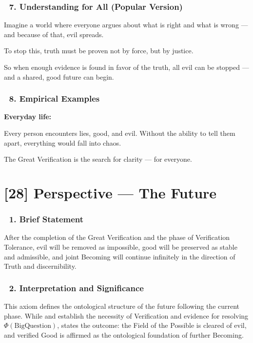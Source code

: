 \documentclass[12pt]{article}
\begin{document}
\subsubsection*{🔹 7. Understanding for All (Popular Version)}

Imagine a world where everyone argues about what is right and what is wrong — and because of that, evil spreads.

To stop this, truth must be proven not by force, but by justice.

So when enough evidence is found in favor of the truth, all evil can be stopped — and a shared, good future can begin.

\subsubsection*{🔹 8. Empirical Examples}

\textbf{Everyday life:}

Every person encounters lies, good, and evil. Without the ability to tell them apart, everything would fall into chaos.

The Great Verification is the search for clarity — for everyone.



\section*{[28] Perspective — The Future}

\subsubsection*{🔹 1. Brief Statement}

After the completion of the Great Verification and the phase of Verification Tolerance, evil will be removed as impossible, good will be preserved as stable and admissible, and joint Becoming will continue infinitely in the direction of Truth and discernibility.

\subsubsection*{🔹 2. Interpretation and Significance}

This axiom defines the ontological structure of the future following the current phase. While \text{[26]} and \text{[27]} establish the necessity of Verification and evidence for resolving $\Phi(\text{BigQuestion})$, \text{[28]} states the outcome: the Field of the Possible is cleared of evil, and verified Good is affirmed as the ontological foundation of further Becoming.
\end{document}

